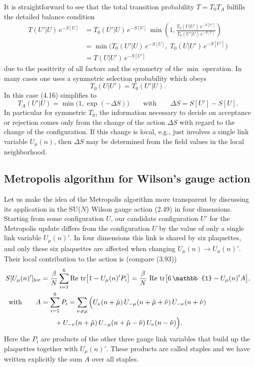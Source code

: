 It is straightforward to see that the total transition probability $T = T_0 T_A$
fulfills the detailed balance condition
\begin{equation}
  \begin{split}
    T(U'|U)\,e^{-S[U]}
    &= T_0(U'|U)\,e^{-S[U]}\,
       \min\!\left(1, \frac{T_0(U|U')\,e^{-S[U']}}{T_0(U'|U)\,e^{-S[U]}}\right) \\
    &= \min\!\big(T_0(U'|U)\,e^{-S[U]},\; T_0(U|U')\,e^{-S[U']}\big) \\
    &= T(U|U')\,e^{-S[U']}
  \end{split}
\end{equation}
due to the positivity of all factors and the symmetry of the $\min$ operation. In
many cases one uses a symmetric selection probability which obeys
\begin{equation}
  T_0(U|U') = T_0(U'|U).
\end{equation}
In this case (4.16) simplifies to
\begin{equation}
  T_A(U'|U) = \min\!\big(1, \exp(-\Delta S)\big)
  \qquad\text{with}\qquad
  \Delta S = S[U'] - S[U].
\end{equation}
In particular for symmetric $T_0$, the information necessary to decide on acceptance or rejection comes only from the change of the action $\Delta S$ with regard
to the change of the configuration. If this change is local, e.g., just involves a
single link variable $U_\mu(n)$, then $\Delta S$ may be determined from the field values
in the local neighborhood.

\subsection{Metropolis algorithm for Wilson's gauge action}

Let us make the idea of the Metropolis algorithm more transparent by
discussing its application in the SU($N$) Wilson gauge action (2.49) in four
dimensions. Starting from some configuration $U$, our candidate configuration $U'$ for the Metropolis update differs from the configuration $U$ by
the value of only a single link variable $U_\mu(n)'$. In four dimensions this
link is shared by six plaquettes, and only these six plaquettes are affected
when changing $U_\mu(n) \to U_\mu(n)'$. Their local contribution to the action is
(compare (3.93))
\begin{equation}
  \begin{split}
    S[U_\mu(n)']_{\mathrm{loc}}
    &= \frac{\beta}{N}\sum_{i=1}^{6}\Re\,\tr\!\big[1 - U_\mu(n)' P_i\big]
     = \frac{\beta}{N}\,\Re\,\tr\!\big[6\,\mathbb{1} - U_\mu(n)' A\big], \\
    \text{with}\qquad
    A &= \sum_{i=1}^{6} P_i
     = \sum_{\nu\neq\mu}\Big(U_\nu(n+\hat{\mu})\,U_{-\mu}(n+\hat{\mu}+\hat{\nu})\,U_{-\nu}(n+\hat{\nu}) \\
    &\qquad + U_{-\nu}(n+\hat{\mu})\,U_{-\mu}(n+\hat{\mu}-\hat{\nu})\,U_\nu(n-\hat{\nu})\Big).
  \end{split}
\end{equation}
Here the $P_i$ are products of the other three gauge link variables that build up
the plaquettes together with $U_\mu(n)'$. These products are called staples and we
have written explicitly the sum $A$ over all staples.

